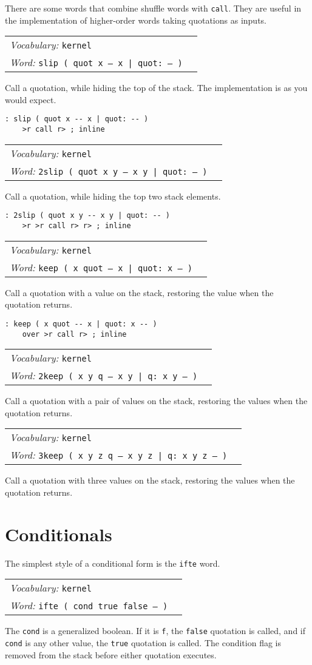 \documentclass{book}
\newcommand{\vocabulary}[1]{\emph{Vocabulary:} \texttt{#1}&\\}
\newcommand{\ordinaryword}[2]{\index{\texttt{#1}}\emph{Word:} \texttt{#2}&\\}
\newcommand{\wordtable}[1]{


\begin{tabularx}{12cm}{lX}
\hline
#1
\hline
\end{tabularx}

}
\begin{document}
There are some words that combine shuffle words with \texttt{call}. They are useful in the implementation of higher-order words taking quotations as inputs.
\wordtable{
\vocabulary{kernel}
\ordinaryword{slip}{slip ( quot x -- x | quot:~-- )}
}
Call a quotation, while hiding the top of the stack. The implementation is as you would expect.
\begin{verbatim}
: slip ( quot x -- x | quot: -- )
    >r call r> ; inline
\end{verbatim}
\wordtable{
\vocabulary{kernel}
\ordinaryword{2slip}{2slip ( quot x y -- x y | quot:~-- )}
}
Call a quotation, while hiding the top two stack elements.
\begin{verbatim}
: 2slip ( quot x y -- x y | quot: -- )
    >r >r call r> r> ; inline
\end{verbatim}
\wordtable{
\vocabulary{kernel}
\ordinaryword{keep}{keep ( x quot -- x | quot:~x -- )}
}
Call a quotation with a value on the stack, restoring the value when the quotation returns.
\begin{verbatim}
: keep ( x quot -- x | quot: x -- )
    over >r call r> ; inline
\end{verbatim}
\wordtable{
\vocabulary{kernel}
\ordinaryword{2keep}{2keep ( x y q -- x y | q:~x y -- )}
}
Call a quotation with a pair of values on the stack, restoring the values when the quotation returns.
\wordtable{
\vocabulary{kernel}
\ordinaryword{3keep}{3keep ( x y z q -- x y z | q:~x y z -- )}
}
Call a quotation with three values on the stack, restoring the values when the quotation returns.

\section{Conditionals}

The simplest style of a conditional form is the \texttt{ifte} word.
\wordtable{
\vocabulary{kernel}
\ordinaryword{ifte}{ifte ( cond true false -- )}
}
The \texttt{cond} is a generalized boolean. If it is \texttt{f}, the \texttt{false} quotation is called, and if \texttt{cond} is any other value, the \texttt{true} quotation is called. The condition flag is removed from the stack before either quotation executes.
\end{document}
